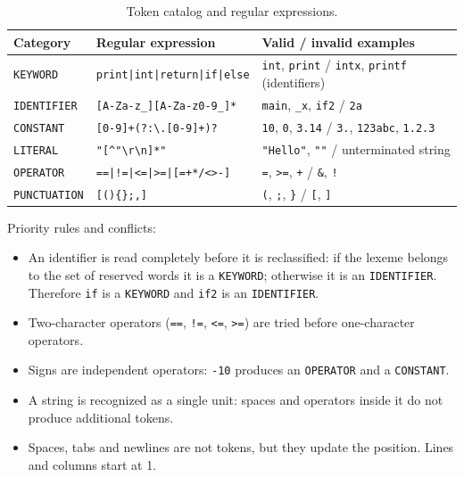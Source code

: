 \documentclass[11pt,letterpaper]{article}
\newcommand{\tok}[1]{\texttt{#1}}
\begin{document}
\begin{table}[H]
\centering
\small
\begin{tabularx}{\linewidth}{@{}l>{\raggedright\arraybackslash}p{4.6cm}>{\raggedright\arraybackslash}X@{}}
\toprule
\textbf{Category} & \textbf{Regular expression} & \textbf{Valid / invalid examples} \\
\midrule
\tok{KEYWORD}     & \texttt{print|int|return|if|else} & \tok{int}, \tok{print} / \tok{intx}, \tok{printf} (identifiers) \\
\tok{IDENTIFIER}  & \texttt{[A-Za-z\_][A-Za-z0-9\_]*} & \tok{main}, \tok{\_x}, \tok{if2} / \tok{2a} \\
\tok{CONSTANT}    & \texttt{[0-9]+(?:\textbackslash.[0-9]+)?} & \tok{10}, \tok{0}, \tok{3.14} / \tok{3.}, \tok{123abc}, \tok{1.2.3} \\
\tok{LITERAL}     & \texttt{"[\textasciicircum"\textbackslash r\textbackslash n]*"} & \tok{"Hello"}, \tok{""} / unterminated string \\
\tok{OPERATOR}    & \texttt{==|!=|<=|>=|[=+*/<>-]} & \tok{=}, \tok{>=}, \tok{+} / \tok{\&}, \tok{!} \\
\tok{PUNCTUATION} & \texttt{[()\{\};,]} & \tok{(}, \tok{;}, \tok{\}} / \tok{[}, \tok{]} \\
\bottomrule
\end{tabularx}
\caption{Token catalog and regular expressions.}
\label{tab:tokens}
\end{table}

Priority rules and conflicts:

\begin{itemize}[nosep]
  \item An identifier is read completely before it is reclassified: if the
        lexeme belongs to the set of reserved words it is a \tok{KEYWORD};
        otherwise it is an \tok{IDENTIFIER}. Therefore \tok{if} is a
        \tok{KEYWORD} and \tok{if2} is an \tok{IDENTIFIER}.
  \item Two-character operators (\tok{==}, \tok{!=}, \tok{<=}, \tok{>=}) are
        tried before one-character operators.
  \item Signs are independent operators: \tok{-10} produces an
        \tok{OPERATOR} and a \tok{CONSTANT}.
  \item A string is recognized as a single unit: spaces and operators inside
        it do not produce additional tokens.
  \item Spaces, tabs and newlines are not tokens, but they update the
        position. Lines and columns start at 1.
\end{itemize}
\end{document}
